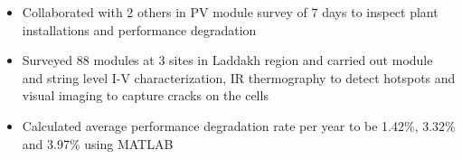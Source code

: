 \documentclass[10 pt]{article}%
\begin{document}
{{\begin{itemize}[leftmargin=*]
\setlength\itemsep{1.5pt}
\setlength\parskip{1.5pt}
\item Collaborated with 2 others in PV module survey of 7 days to inspect plant installations and performance degradation
\item Surveyed 88 modules at 3 sites in Laddakh region and carried out module and string level I-V characterization, IR thermography to detect hotspots and visual imaging to capture cracks on the cells
\item Calculated average performance degradation rate per year to be  1.42\%, 3.32\% and 3.97\% using MATLAB
\end{itemize}

}}
\end{document}
